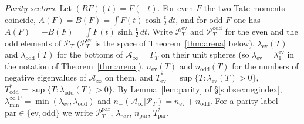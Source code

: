 \documentclass[11pt]{amsart}
\theoremstyle{definition}
\theoremstyle{remark}
\newcommand{\PT}{\mathcal P_T}
\newcommand{\Ainf}{\mathcal A_\infty}
\newcommand{\laminfP}{\lambda^{\infty,\mathrm P}_{\min}}
\begin{document}
\emph{Parity sectors.} Let $(RF)(t)=F(-t)$. For even $F$ the two Tate moments coincide,
$A(F)=B(F)=\int F(t)\cosh\frac t2\,dt$, and for odd $F$ one has $A(F)=-B(F)=\int F(t)\sinh\frac t2\,dt$.
Write $\PT^{\mathrm{ev}}$ and $\PT^{\mathrm{odd}}$ for the even and the odd elements of $\PT$
($\PT^{\mathrm{ev}}$ is the space of Theorem~\ref{thm:arena} below), $\lambda_{\mathrm{ev}}(T)$ and
$\lambda_{\mathrm{odd}}(T)$ for the bottoms of $\Ainf=\Gamma_T$ on their unit spheres (so
$\lambda_{\mathrm{ev}}=\lambda^{\mathrm{ev}}_1$ in the notation of Theorem~\ref{thm:arena}),
$n_{\mathrm{ev}}(T)$ and $n_{\mathrm{odd}}(T)$ for the numbers of negative eigenvalues of $\Ainf$ on them,
and $T^*_{\mathrm{ev}}=\sup\{T:\lambda_{\mathrm{ev}}(T)>0\}$, $T^*_{\mathrm{odd}}=\sup\{T:\lambda_{\mathrm{odd}}(T)>0\}$.
By Lemma~\ref{lem:parity} of \S\ref{subsec:negindex}, $\laminfP=\min(\lambda_{\mathrm{ev}},\lambda_{\mathrm{odd}})$
and $n_-(\Ainf|\PT)=n_{\mathrm{ev}}+n_{\mathrm{odd}}$. For a parity label $\mathrm{par}\in\{\mathrm{ev},\mathrm{odd}\}$
we write $\PT^{\mathrm{par}}$, $\lambda_{\mathrm{par}}$, $n_{\mathrm{par}}$, $T^*_{\mathrm{par}}$.
\end{document}
